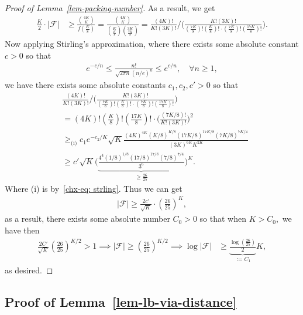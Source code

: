 \documentclass[10pt, letterpaper]{article}
\begin{document}
\begin{proof}[Proof of Lemma~\ref{lem-packing-number}]
As a result, we get \begin{align*}
    \frac{K}{2}\cdot \lvert \mathcal{F}\rvert &\geq \frac{\binom{4K}{K}}{f( \frac{K}{8})} = \frac{\binom{4K}{K}}{\binom{K}{ \frac{K}{8}}\binom{3K}{\frac{7K}{8}}}= \frac{(4K)!}{K!(3K)!}\bigg/\bigg( \frac{K!(3K)!}{(\frac{7K}{8})!( \frac{K}{8} )! \cdot (\frac{7K}{8})! (\frac{17K}{8} )!} \bigg).
\end{align*}
Now applying Stirling's approximation, where there exists some absolute constant $c>0$ so that \begin{align}\label{chx-eq: strling}
   e^{-c/n} \leq  \frac{n!}{\sqrt{2\pi n} (n/e)^n}  \leq e^{c/n},\quad \forall n\geq 1,
\end{align}
we have there exists some absolute constants $c_1,c_2,c'>0$ so that
\begin{align*}
    &\frac{(4K)!}{K!(3K)!}\bigg/\bigg( \frac{K!(3K)!}{(\frac{7K}{8})!( \frac{K}{8} )! \cdot (\frac{7K}{8})! (\frac{17K}{8} )!} \bigg) \\
    &= (4K)! (\frac{K}{8})! (\frac{17K}{8})! \cdot\bigg(\frac{(7K/8)!}{K!(3K)!} \bigg)^2\\
    &\geq_{\text{(i)}} c_1 e^{-c_2/K}\sqrt{K} \frac{(4K)^{4K} (K/8)^{K/8} (17K/8)^{17K/8} (7K/8)^{7K/4}}{(3K)^{6K} K^{2K}}\\
    &\geq c'\sqrt{K} \bigg(\underbrace{\frac{4^4 (1/8)^{1/8} (17/8)^{17/8} (7/8)^{7/4} }{3^6 }}_{\geq \frac{26}{25}}\bigg)^K.
\end{align*}
Where (i) is by~\eqref{chx-eq: strling}. 
Thus we can get\begin{align*}
    \lvert \mathcal{ F} \rvert \geq \frac{2c'}{\sqrt{K}} \cdot (\frac{26}{25})^K, 
\end{align*}
as a result, there exists some absolute number $C_0 >0$ so that when $K >C_0,$ we have then
\begin{align*}
    \frac{2C'}{\sqrt{K}} (\frac{26}{25})^{K/2} > 1 \implies \lvert \mathcal{ F} \rvert \geq (\frac{26}{25})^{K/2} \implies \log \lvert  \mathcal{F}\rvert &\geq \underbrace{\frac{\log(\frac{26}{25})}{2}}_{:= C_1} K,
\end{align*}
as desired.
\end{proof}



\subsection{Proof of Lemma~\ref{lem-lb-via-distance}}
\end{document}
